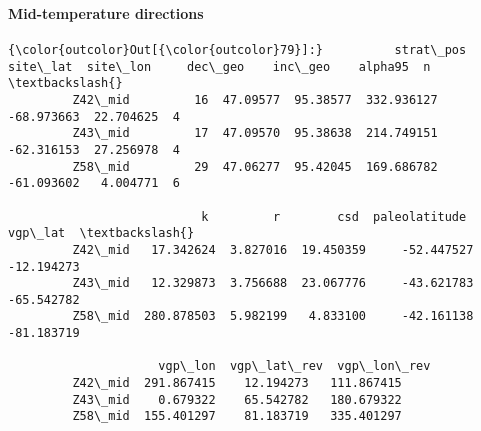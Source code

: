 \documentclass[11pt]{article}
\begin{document}
    \begin{center}
    \end{center}
    { \hspace*{\fill} \\}
    

    \begin{center}
    \end{center}
    { \hspace*{\fill} \\}
    
    \paragraph{Mid-temperature directions}\label{mid-temperature-directions}


            \begin{Verbatim}[commandchars=\\\{\}]
{\color{outcolor}Out[{\color{outcolor}79}]:}          strat\_pos  site\_lat  site\_lon     dec\_geo    inc\_geo    alpha95  n  \textbackslash{}
         Z42\_mid         16  47.09577  95.38577  332.936127 -68.973663  22.704625  4   
         Z43\_mid         17  47.09570  95.38638  214.749151 -62.316153  27.256978  4   
         Z58\_mid         29  47.06277  95.42045  169.686782 -61.093602   4.004771  6   
         
                           k         r        csd  paleolatitude    vgp\_lat  \textbackslash{}
         Z42\_mid   17.342624  3.827016  19.450359     -52.447527 -12.194273   
         Z43\_mid   12.329873  3.756688  23.067776     -43.621783 -65.542782   
         Z58\_mid  280.878503  5.982199   4.833100     -42.161138 -81.183719   
         
                     vgp\_lon  vgp\_lat\_rev  vgp\_lon\_rev  
         Z42\_mid  291.867415    12.194273   111.867415  
         Z43\_mid    0.679322    65.542782   180.679322  
         Z58\_mid  155.401297    81.183719   335.401297  
\end{Verbatim}
        

    \begin{center}
    \end{center}
    { \hspace*{\fill} \\}
    
\end{document}
